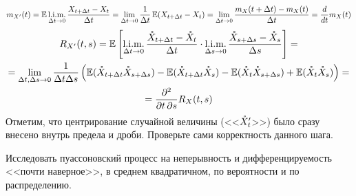 \begin{solution}
    \[
        m_{X'}(t) = \operatorname{\mathbb{E}} \operatorname*{\textnormal{l.i.m.}}_{\Delta t \to 0} \frac{X_{t + \Delta t} - X_t}{\Delta t} = \lim_{\Delta t \to 0} \frac{1}{\Delta t} \operatorname{\mathbb{E}} (X_{t + \Delta t} - X_t) =
        \lim_{\Delta t \to 0} \frac{m_X(t + \Delta t) - m_X(t)}{\Delta t} = \frac{d}{d t} m_X(t)
    \]
    \begin{multline*}
        R_{X'}(t, s) = \operatorname{\mathbb{E}} \left[ \operatorname*{\textnormal{l.i.m.}}_{\Delta t \to 0} \frac{\mathring{X}_{t + \Delta t} - \mathring{X}_t}{\Delta t} \cdot
        \operatorname*{\textnormal{l.i.m.}}_{\Delta s \to 0} \frac{\mathring{X}_{s + \Delta s} - \mathring{X}_s}{\Delta s} \right] = \\
        = \lim_{\Delta t, \Delta s \to 0} \frac{1}{\Delta t \Delta s} \left( \operatorname{\mathbb{E}} (\mathring{X}_{t + \Delta t} \mathring{X}_{s + \Delta s}) -
        \operatorname{\mathbb{E}} (\mathring{X}_{t + \Delta t} \mathring{X}_s) - \operatorname{\mathbb{E}} (\mathring{X}_t \mathring{X}_{s + \Delta s}) + \operatorname{\mathbb{E}} (\mathring{X}_t \mathring{X}_s) \right) = \\
        = \frac{\partial^2}{\partial t \, \partial s} R_X(t, s)
    \end{multline*}
    Отметим, что центрирование случайной величины (<<$ \mathring{X}_t' $>>) было сразу внесено внутрь предела и дроби.
    Проверьте сами корректность данного шага.
\end{solution}


\begin{exercise}
    \label{exercise:calculus:poisson_process_continuity_and_differentiability}
    Исследовать пуассоновский процесс на неперывность и дифференцируемость <<почти наверное>>, в среднем квадратичном, по вероятности и по распределению.
\end{exercise}

